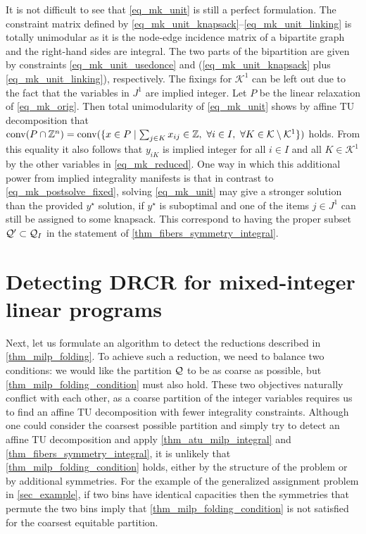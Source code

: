 \documentclass[pdflatex,sn-mathphys-num]{sn-jnl}%
\theoremstyle{thmstyleone}%
\theoremstyle{thmstylethree}%
\theoremstyle{thmstyletwo}%
\newcommand{\conv}{\mathrm{conv}}
\begin{document}
It is not difficult to see that \eqref{eq_mk_unit} is still a perfect formulation. The constraint matrix defined by \eqref{eq_mk_unit_knapsack}--\eqref{eq_mk_unit_linking} is totally unimodular as it is the node-edge incidence matrix of a bipartite graph and the right-hand sides are integral. The two parts of the bipartition are given by constraints \eqref{eq_mk_unit_usedonce} and (\eqref{eq_mk_unit_knapsack} plus \eqref{eq_mk_unit_linking}), respectively. The fixings for $\mathcal{K}^1$ can be left out due to the fact that the variables in $J^1$ are implied integer. Let $P$ be the linear relaxation of \eqref{eq_mk_orig}. Then total unimodularity of \eqref{eq_mk_unit} shows by affine TU decomposition that $\conv(P\cap \Z^n) = \conv(\{x\in P \mid \sum_{j\in K} x_{ij} \in \Z, ~ \forall i\in I, ~\forall K \in \mathcal{K}\setminus \mathcal{K}^1\})$ holds. From this equality it also follows that $y_{iK}$ is implied integer for all $i\in I$ and all $K\in \mathcal{K}^1$ by the other variables in \eqref{eq_mk_reduced}. One way in which this additional power from implied integrality manifests is that in contrast to \eqref{eq_mk_postsolve_fixed}, solving \eqref{eq_mk_unit} may give a stronger solution than the provided $y^\star$ solution, if $y^\star$ is suboptimal and one of the items $j\in J^1$ can still be assigned to some knapsack. This correspond to having the proper subset $\mathcal{Q}' \subset \mathcal{Q}_I$ in the statement of \cref{thm_fibers_symmetry_integral}.

\section{Detecting DRCR for mixed-integer linear programs}
\label{sec_algorithm}
Next, let us formulate an algorithm to detect the reductions described in \cref{thm_milp_folding}. To achieve such a reduction, we need to balance two conditions: we would like the partition $\mathcal{Q}$ to be as coarse as possible, but \eqref{thm_milp_folding_condition} must also hold. These two objectives naturally conflict with each other, as a coarse partition of the integer variables requires us to find an affine TU decomposition with fewer integrality constraints. Although one could consider the coarsest possible partition and simply try to detect an affine TU decomposition and apply \cref{thm_atu_milp_integral} and \cref{thm_fibers_symmetry_integral}, it is unlikely that \eqref{thm_milp_folding_condition} holds, either by the structure of the problem or by additional symmetries. For the example of the generalized assignment problem in \cref{sec_example}, if two bins have identical capacities then the symmetries that permute the two bins imply that \eqref{thm_milp_folding_condition} is not satisfied for the coarsest equitable partition. \\
\end{document}
